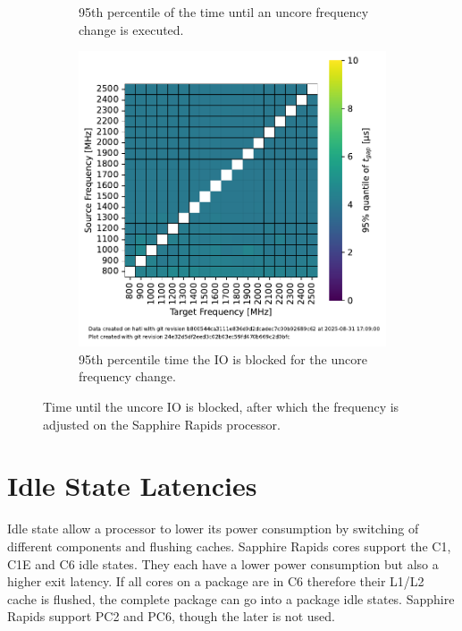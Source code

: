 \begin{figure}[]
\begin{subfigure}[t]{0.3\linewidth}
        \caption{\label{fig:ufs_init_95}95th percentile of the time until an uncore frequency change is executed.}
    \end{subfigure}
    \hfill
    \begin{subfigure}[t]{0.3\linewidth}
        \centering
        \includegraphics[width=\linewidth]{fig/uncore-frequency-switching-latency/95percentile-t-gap.pdf}
        \caption{\label{fig:ufs_gap_95}95th percentile time the IO is blocked for the uncore frequency change.}
    \end{subfigure}
    \caption{Time until the uncore IO is blocked, after which the frequency is adjusted on the Sapphire Rapids processor.}
\end{figure}

\section{Idle State Latencies}

Idle state allow a processor to lower its power consumption by switching of different components and flushing caches.
Sapphire Rapids cores support the C1, C1E and C6 idle states.
They each have a lower power consumption but also a higher exit latency.
If all cores on a package are in C6 therefore their L1/L2 cache is flushed, the complete package can go into a package idle states.
Sapphire Rapids support PC2 and PC6, though the later is not used.


